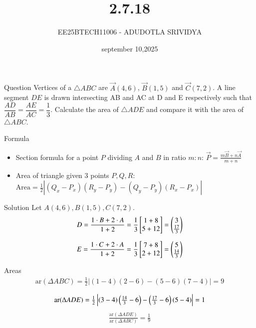 \documentclass{beamer}
\title %
{2.7.18}
\date{september 10,2025}
\author %
{EE25BTECH11006 - ADUDOTLA SRIVIDYA}
\begin{document}
\frame{\titlepage}

\begin{frame}{Question}
Vertices of a $\triangle ABC$ are $\vec{A}(4,6)$, $\vec{B}(1,5)$ and $\vec{C}(7,2)$.  
A line segment $DE$ is drawn intersecting AB and AC at D and E respectively such that  
$\dfrac{AD}{AB} = \dfrac{AE}{AC} = \dfrac{1}{3}$.  
Calculate the area of $\triangle ADE$ and compare it with the area of $\triangle ABC$.
\end{frame}

\begin{frame}{Formula}
\begin{itemize}
    \item Section formula for a point $P$ dividing $A$ and $B$ in ratio $m:n$:
    $
    \vec{P} = \frac{m\vec{B}+n\vec{A}}{m+n}
    $
    \item Area of triangle given 3 points $P,Q,R$:
    $
    \text{Area} = \frac{1}{2}\left| 
    (Q_x-P_x)(R_y-P_y) - (Q_y-P_y)(R_x-P_x)
    \right|
    $
\end{itemize}
\end{frame}

\begin{frame}{Solution}
Let $A(4,6), B(1,5), C(7,2)$.
\begin{align}
D = \frac{1\cdot B + 2\cdot A}{1+2}
= \frac{1}{3}\begin{bmatrix}1+8 \\ 5+12 \end{bmatrix}
= \begin{pmatrix}3\\\tfrac{17}{3}\end{pmatrix}
\end{align}

\begin{align}
E = \frac{1\cdot C + 2\cdot A}{1+2}
= \frac{1}{3}\begin{bmatrix}7+8 \\ 2+12 \end{bmatrix}
= \begin{pmatrix}5\\\tfrac{14}{3}\end{pmatrix}
\end{align}
\end{frame}

\begin{frame}{Areas}
\begin{align}
\text{ar}(\Delta ABC) = \tfrac{1}{2}\left|
(1-4)(2-6) - (5-6)(7-4) \right| = 9
\end{align}

\begin{align}
\text{ar}(\Delta ADE) = \tfrac{1}{2}\left|
(3-4)\left(\tfrac{14}{3}-6\right) - \left(\tfrac{17}{3}-6\right)(5-4) \right| = 1
\end{align}
\begin{align}
\frac{\text{ar}(\Delta ADE)}{\text{ar}(\Delta ABC)} = \frac{1}{9}
\end{align}
\end{frame}
\end{document}
